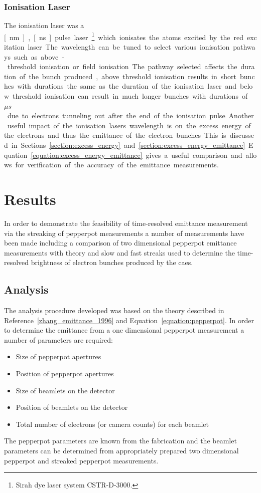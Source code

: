 \subsubsection{Ionisation Laser}
The ionisation laser was a \unit[457-493][nm], \unit[10][ns] pulse laser\footnote{Sirah dye laser system CSTR-D-3000.} which ionisates the atoms excited by the red excitation laser.
The wavelength can be tuned to select various ionisation pathways such as above-threshold ionisation or field ionisation.
The pathway selected affects the duration of the bunch produced, above threshold ionisation results in short bunches with durations the same as the duration of the ionisation laser and below threshold ionisation can result in much longer bunches with durations of \unit[10s]{$\mu s$} due to electrons tunneling out after the end of the ionisation pulse.

Another useful impact of the ionisation lasers wavelength is on the excess energy of the electrons and thus the emittance of the electron bunches.
This is discussed in Sections~\ref{section:excess_energy} and \ref{section:excess_energy_emittance}.
Equation~\ref{equation:excess_energy_emittance} gives a useful comparison and allows for verification of the accuracy of the emittance measurements.

\section{Results}
In order to demonstrate the feasibility of time-resolved emittance measurement via the streaking of pepperpot measurements a number of measurements have been made including a comparison of two dimensional pepperpot emittance measurements with theory and slow and fast streaks used to determine the time-resolved brightness of electron bunches produced by the \gls{caes}.

\subsection{Analysis}
The analysis procedure developed was based on the theory described in Reference~\ref{zhang_emittance_1996} and Equation~\ref{equation:pepperpot}.
In order to determine the emittance from a one dimensional pepperpot measurement a number of parameters are required:
\begin{itemize}
    \item Size of pepperpot apertures
    \item Position of pepperpot apertures
    \item Size of beamlets on the detector
    \item Position of beamlets on the detector
    \item Total number of electrons (or camera counts) for each beamlet
\end{itemize}
The pepperpot parameters are known from the fabrication and the beamlet parameters can be determined from appropriately prepared two dimensional pepperpot and streaked pepperpot measurements.

